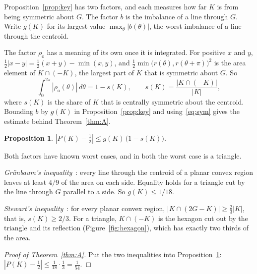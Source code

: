 \documentclass[11pt]{article}
\newtheorem{proposition}{Proposition}
\theoremstyle{remark}
\newcommand{\ro}{\rho_{\mathrm o}}
\newcommand{\abs}[1]{\left|#1\right|}
\begin{document}
Proposition~\ref{prop:key} has two factors, and each measures how far $K$ is from being symmetric about
$G$. The factor $b$ is the imbalance of a line through $G$. Write $g(K)$ for its largest value
$\max_\theta\abs{b(\theta)}$, the worst imbalance of a line through the centroid.

The factor $\ro$ has a meaning of its own once it is integrated. For positive $x$ and $y$,
$\tfrac12\abs{x-y}=\tfrac12(x+y)-\min(x,y)$, and $\tfrac12\min\bigl(r(\theta),r(\theta+\pi)\bigr)^2$ is
the area element of $K\cap(-K)$, the largest part of $K$ that is symmetric about $G$. So
\begin{equation}\label{eq:sym}
\int_0^{2\pi}\abs{\ro(\theta)}\,d\theta = 1-s(K),\qquad s(K)=\frac{\abs{K\cap(-K)}}{\abs{K}} ,
\end{equation}
where $s(K)$ is the share of $K$ that is centrally symmetric about the centroid. Bounding $b$ by $g(K)$
in Proposition~\ref{prop:key} and using~\eqref{eq:sym} gives the estimate behind Theorem~\ref{thm:A}.

\begin{proposition}\label{prop:product}
$\abs{P(K)-\tfrac12}\le g(K)\,\bigl(1-s(K)\bigr)$.
\end{proposition}

Both factors have known worst cases, and in both the worst case is a triangle.

\emph{Gr\"unbaum's inequality}~\cite[Theorem~2 and its proof]{Gru60}: every line through the centroid of
a planar convex region leaves at least $4/9$ of the area on each side. Equality holds for a triangle cut
by the line through $G$ parallel to a side. So $g(K)\le 1/18$.

\emph{Stewart's inequality}~\cite{Ste58}: for every planar convex region,
$\abs{K\cap(2G-K)}\ge\tfrac23\abs{K}$, that is, $s(K)\ge 2/3$. For a triangle, $K\cap(-K)$ is the hexagon
cut out by the triangle and its reflection (Figure~\ref{fig:hexagon}), which has exactly two thirds of
the area.

\begin{proof}[Proof of Theorem~\ref{thm:A}]
Put the two inequalities into Proposition~\ref{prop:product}:
$\abs{P(K)-\tfrac12}\le\tfrac1{18}\cdot\tfrac13=\tfrac1{54}$.
\end{proof}
\end{document}
